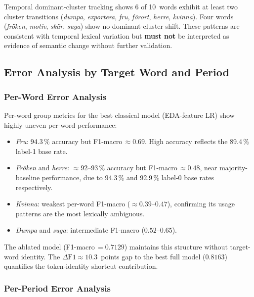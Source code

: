 Temporal dominant-cluster tracking shows 6 of 10~words exhibit at least
two cluster transitions (\emph{dumpa}, \emph{exportera}, \emph{fru},
\emph{f\"{o}rort}, \emph{herre}, \emph{kvinna}).  Four words
(\emph{fr\"{o}ken}, \emph{motiv}, \emph{sk\"{a}r}, \emph{suga}) show no
dominant-cluster shift.  These patterns are consistent with temporal lexical
variation but \textbf{must not} be interpreted as evidence of semantic change
without further validation.


\subsection{Error Analysis by Target Word and Period}
\label{sec:baselines:error}

\subsubsection{Per-Word Error Analysis}

Per-word group metrics for the best classical model (EDA-feature LR) show
highly uneven per-word performance:
\begin{itemize}
  \item \emph{Fru}: 94.3\,\% accuracy but F1-macro\,$\approx0.69$.
    High accuracy reflects the 89.4\,\% label-1 base rate.
  \item \emph{Fr\"{o}ken} and \emph{herre}: $\approx$92--93\,\% accuracy
    but F1-macro\,$\approx0.48$, near majority-baseline performance, due to
    94.3\,\% and 92.9\,\% label-0 base rates respectively.
  \item \emph{Kvinna}: weakest per-word F1-macro ($\approx0.39$--$0.47$),
    confirming its usage patterns are the most lexically ambiguous.
  \item \emph{Dumpa} and \emph{suga}: intermediate F1-macro ($0.52$--$0.65$).
\end{itemize}

The ablated model (F1-macro\,$=0.7129$) maintains this structure without
target-word identity.  The $\Delta\text{F1}\approx10.3$~points gap to the
best full model ($0.8163$) quantifies the token-identity shortcut contribution.

\subsubsection{Per-Period Error Analysis}

